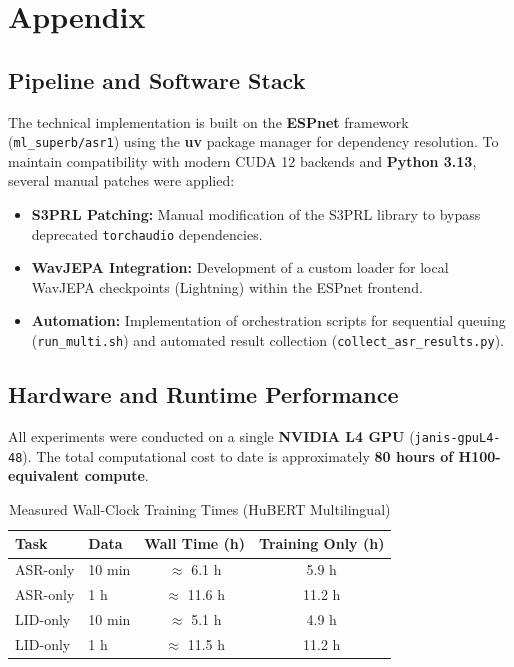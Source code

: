 \documentclass[11pt]{article}
\begin{document}
\newpage
\section{Appendix}
\label{sec:appendix}



\subsection{Pipeline and Software Stack}
The technical implementation is built on the \textbf{ESPnet} framework (\texttt{ml\_superb/asr1}) using the \textbf{uv} package manager for dependency resolution. To maintain compatibility with modern CUDA 12 backends and \textbf{Python 3.13}, several manual patches were applied:
\begin{itemize}
    \item \textbf{S3PRL Patching:} Manual modification of the S3PRL library to bypass deprecated \texttt{torchaudio} dependencies.
    \item \textbf{WavJEPA Integration:} Development of a custom loader for local WavJEPA checkpoints (Lightning) within the ESPnet frontend.
    \item \textbf{Automation:} Implementation of orchestration scripts for sequential queuing (\texttt{run\_multi.sh}) and automated result collection (\texttt{collect\_asr\_results.py}).
\end{itemize}

\subsection*{Hardware and Runtime Performance}
All experiments were conducted on a single \textbf{NVIDIA L4 GPU} (\texttt{janis-gpuL4-48}). The total computational cost to date is approximately \textbf{80 hours of H100-equivalent compute}. 

\begin{table}[h]
    \centering
    \caption{Measured Wall-Clock Training Times (HuBERT Multilingual)}
    \begin{tabular}{@{}llcc@{}}
        \toprule
        \textbf{Task} & \textbf{Data} & \textbf{Wall Time (h)} & \textbf{Training Only (h)} \\ \midrule
        ASR-only & 10 min & $\approx$ 6.1 h & 5.9 h \\
        ASR-only & 1 h & $\approx$ 11.6 h & 11.2 h \\
        LID-only & 10 min & $\approx$ 5.1 h & 4.9 h \\
        LID-only & 1 h & $\approx$ 11.5 h & 11.2 h \\ \bottomrule
    \end{tabular}
\end{table}
\end{document}
